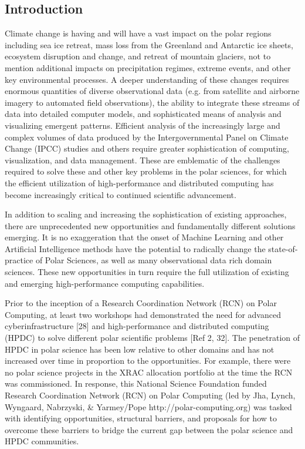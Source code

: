 \documentclass[10pt,letterpaper,draft]{article}
\begin{document}
\vspace{0.15in}

\subsection*{Introduction}

Climate change is having and will have a vast impact on the polar regions including sea ice retreat, mass loss from the Greenland and Antarctic ice sheets, ecosystem disruption and change, and retreat of mountain glaciers, not to mention additional impacts on precipitation regimes, extreme events, and other key environmental processes. A deeper understanding of these changes requires enormous quantities of diverse observational data (e.g. from satellite and airborne imagery to automated field observations), the ability to integrate these streams of data into detailed computer models, and sophisticated means of analysis and visualizing emergent patterns.  Efficient analysis of the increasingly large and complex volumes of data produced by the Intergovernmental Panel on Climate Change (IPCC) studies and others require greater sophistication of computing, visualization, and data management. These are emblematic of the challenges required to solve these and other key problems in the polar sciences, for which the efficient utilization of high-performance and distributed computing has become increasingly critical to continued scientific advancement.

In addition to scaling and increasing the sophistication of existing approaches, there are unprecedented new opportunities and fundamentally different solutions emerging. It is no exaggeration that the onset of Machine Learning and other Artificial Intelligence methods have the potential to radically change the state-of-practice of Polar Sciences, as well as many observational data rich domain sciences.  These new opportunities in turn require the full utilization of existing and emerging high-performance computing capabilities. 

Prior to the inception of a Research Coordination Network (RCN) on Polar Computing, at least two workshops had demonstrated the need for advanced cyberinfrastructure [28] and high-performance and distributed computing (HPDC) to solve different polar scientific problems [Ref 2, 32]. The penetration of HPDC in polar science has been low relative to other domains and has not increased over time in proportion to the opportunities. For example, there were no polar science projects in the XRAC allocation portfolio at the time the RCN was commissioned. In response, this National Science Foundation funded Research Coordination Network (RCN) on Polar Computing (led by Jha, Lynch, Wyngaard, Nabrzyski, \& Yarmey/Pope http://polar-computing.org) was tasked with identifying opportunities, structural barriers, and proposals for how to overcome these barriers to bridge the current gap between the polar science and HPDC communities.
\end{document}
